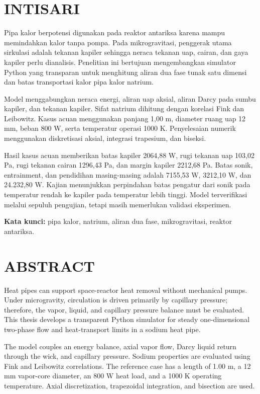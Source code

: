 \documentclass[
  12pt,a4paper,oneside]{report}
\begin{document}
\hypertarget{intisari}{%
\chapter*{INTISARI}\label{intisari}}

Pipa kalor berpotensi digunakan pada reaktor antariksa karena mampu
memindahkan kalor tanpa pompa. Pada mikrogravitasi, penggerak utama
sirkulasi adalah tekanan kapiler sehingga neraca tekanan uap, cairan,
dan gaya kapiler perlu dianalisis. Penelitian ini bertujuan
mengembangkan simulator Python yang transparan untuk menghitung aliran
dua fase tunak satu dimensi dan batas transportasi kalor pipa kalor
natrium.

Model menggabungkan neraca energi, aliran uap aksial, aliran Darcy pada
sumbu kapiler, dan tekanan kapiler. Sifat natrium dihitung dengan
korelasi Fink dan Leibowitz. Kasus acuan menggunakan panjang 1,00 m,
diameter ruang uap 12 mm, beban 800 W, serta temperatur operasi 1000 K.
Penyelesaian numerik menggunakan diskretisasi aksial, integrasi
trapesium, dan biseksi.

Hasil kasus acuan memberikan batas kapiler 2064,88 W, rugi tekanan uap
103,02 Pa, rugi tekanan cairan 1296,43 Pa, dan margin kapiler 2212,68
Pa. Batas sonik, entrainment, dan pendidihan masing-masing adalah
7155,53 W, 3212,10 W, dan 24.232,80 W. Kajian menunjukkan perpindahan
batas pengatur dari sonik pada temperatur rendah ke kapiler pada
temperatur lebih tinggi. Model terverifikasi melalui sepuluh pengujian,
tetapi masih memerlukan validasi eksperimen.

\textbf{Kata kunci:} pipa kalor, natrium, aliran dua fase,
mikrogravitasi, reaktor antariksa.

\hypertarget{abstract}{%
\chapter*{ABSTRACT}\label{abstract}}

Heat pipes can support space-reactor heat removal without mechanical
pumps. Under microgravity, circulation is driven primarily by capillary
pressure; therefore, the vapor, liquid, and capillary pressure balance
must be evaluated. This thesis develops a transparent Python simulator
for steady one-dimensional two-phase flow and heat-transport limits in a
sodium heat pipe.

The model couples an energy balance, axial vapor flow, Darcy liquid
return through the wick, and capillary pressure. Sodium properties are
evaluated using Fink and Leibowitz correlations. The reference case has
a length of 1.00 m, a 12 mm vapor-core diameter, an 800 W heat load, and
a 1000 K operating temperature. Axial discretization, trapezoidal
integration, and bisection are used.
\end{document}
